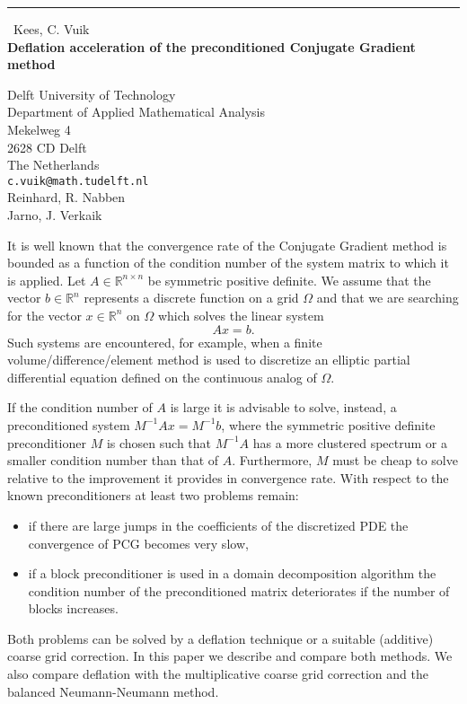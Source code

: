 \documentclass{report}
\begin{document}
\begin{center}
\rule{6in}{1pt} \
{\large Kees, C. Vuik \\
{\bf Deflation acceleration of the preconditioned Conjugate Gradient method}}

Delft University of Technology \\ Department of Applied Mathematical Analysis \\ Mekelweg 4 \\ 2628 CD Delft \\ The Netherlands
\\
{\tt c.vuik@math.tudelft.nl}\\
Reinhard, R. Nabben\\
Jarno, J. Verkaik\end{center}

It is well known that the convergence rate of the Conjugate Gradient
method
is bounded as a function of the condition number of the system matrix to
which
it is applied.
Let $A\in\mathbb{R}^{n\times n}$ be symmetric positive definite.
We assume that the vector $b\in\mathbb{R}^n$ represents a discrete
function on a
grid $\Omega$ and that we are searching for the vector
$x\in\mathbb{R}^n$
on $\Omega$ which solves the linear system
\[
Ax = b.
\]
Such systems are encountered, for example, when a finite
volume/difference/element method is used to discretize an elliptic
partial differential equation defined on the continuous analog of
$\Omega$.

If the condition number of $A$ is large it is advisable to solve,
instead, a preconditioned system
$M^{-1}Ax=M^{-1}b$, where the symmetric positive definite
preconditioner $M$ is
chosen such that $M^{-1}A$ has a more clustered spectrum
or a smaller condition number than that
of $A$. Furthermore, $M$ must be cheap to solve relative to the
improvement it provides in convergence rate.
With respect to the known preconditioners at least two problems remain:
\begin{itemize}
\item if there are large jumps in the coefficients of the discretized
PDE the convergence of PCG becomes very slow,
\item if a block preconditioner is used in a domain decomposition
algorithm the condition number of the preconditioned matrix deteriorates
if the number of blocks increases.
\end{itemize}
Both problems can be solved by a deflation technique or a suitable (additive)
coarse grid correction. In this paper we describe and compare both methods. We
also compare deflation with the multiplicative coarse grid correction and the
balanced Neumann-Neumann method.
\end{document}
